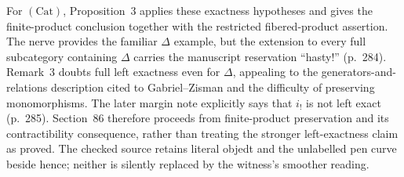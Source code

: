 \documentclass[10pt,oneside]{book}
\begin{document}
For $(\mathrm{Cat})$, Proposition~3 applies these exactness hypotheses and gives the finite-product conclusion together with the restricted fibered-product assertion. The nerve provides the familiar $\Delta$ example, but the extension to every full subcategory containing $\Delta$ carries the manuscript reservation “hasty!” (p.\ 284). Remark~3 doubts full left exactness even for $\Delta$, appealing to the generators-and-relations description cited to Gabriel--Zisman and the difficulty of preserving monomorphisms. The later margin note explicitly says that $i_!$ is not left exact (p.\ 285). Section~86 therefore proceeds from finite-product preservation and its contractibility consequence, rather than treating the stronger left-exactness claim as proved. The checked source retains literal objedt and the unlabelled pen curve beside hence; neither is silently replaced by the witness's smoother reading.
\end{document}
